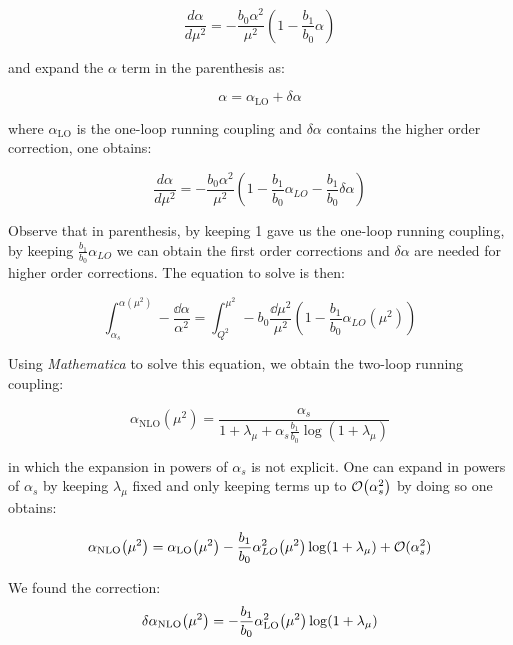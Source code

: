 \documentclass[../main.tex]{subfiles}
\begin{document}
\begin{equation}
    \frac{d\alpha}{d\mu^2} = - \frac{b_0 \alpha^2}{\mu^2} ( 1 - \frac{b_1}{b_0} \alpha )
\end{equation}

and expand the $\alpha$ term in the parenthesis as:

\begin{equation}
    \alpha = \alpha_{\text{LO}} + \delta \alpha
\end{equation}

where $\alpha_{\text{LO}}$ is the one-loop running coupling and $\delta\alpha$ contains the higher order correction, one obtains:

\begin{equation}
    \frac{d\alpha}{d\mu^2} = - \frac{b_0 \alpha^2}{\mu^2} ( 1 - \frac{b_1}{b_0} \alpha_{LO} - \frac{b_1}{b_0} \delta\alpha)
\end{equation}

Observe that in parenthesis, by keeping 1 gave us the one-loop running coupling, by keeping $\frac{b_1}{b_0} \alpha_{LO}$ we can obtain the first order corrections
and $\delta\alpha$ are needed for higher order corrections. The equation to solve is then:

\begin{equation}
    \int_{\alpha_s}^{\alpha(\mu^2)} -\frac{\dd\alpha}{\alpha^2} = 
    \int _{Q^2}^{\mu^2} - b_0 \frac{ \dd\mu^2}{\mu^2} ( 1 - \frac{b_1}{b_0} \alpha_{LO}(\mu^2) )
\end{equation}

Using \emph{Mathematica} to solve this equation, we obtain the two-loop running coupling:

\begin{equation}
    \alpha_{\text{NLO}}(\mu^2) = \frac{\alpha_s}{1+\lambda_\mu + \alpha_s \frac{b_1}{b_0} \log(1+\lambda_\mu)}
\end{equation}

in which the expansion in powers of $\alpha_s$ is not explicit. One can expand 
in powers of $\alpha_s$ by keeping $\lambda_\mu$ fixed and only keeping terms up to 
$\order{\alpha_s^2}$ by doing so one obtains:

\begin{equation}\label{eq:NLO}
    \alpha_{\text{NLO}}\qty(\mu^2) = \alpha_{\text{LO}}\qty(\mu^2) -\frac{b_1}{b_0} \alpha_{LO}^2\qty(\mu^2) \log(1+\lambda_\mu) + \mathcal{O}(\alpha_s^2)
\end{equation}

We found the correction: 
\begin{equation}\label{eq:DNLO}
\delta\alpha_{\text{NLO}}\qty(\mu^2) = -\frac{b_1}{b_0} \alpha_{\text{LO}}^2\qty(\mu^2) \log(1+\lambda_\mu)
\end{equation}
\end{document}
